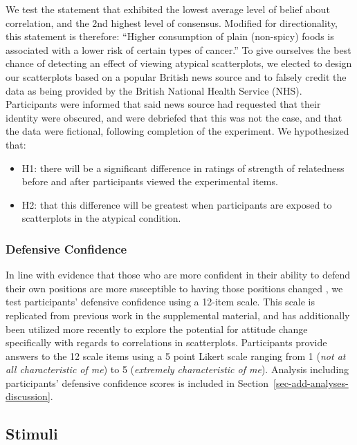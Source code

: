 \documentclass[manuscript,screen,review,anonymous]{acmart}
\providecommand{\tightlist}{%
  \setlength{\itemsep}{0pt}\setlength{\parskip}{0pt}}\usepackage{longtable,booktabs,array}
\begin{document}
We test the statement that exhibited the lowest average level of belief
about correlation, and the 2nd highest level of consensus. Modified for
directionality, this statement is therefore: ``Higher consumption of
plain (non-spicy) foods is associated with a lower risk of certain types
of cancer.'' To give ourselves the best chance of detecting an effect of
viewing atypical scatterplots, we elected to design our scatterplots
based on a popular British news source and to falsely credit the data as
being provided by the British National Health Service (NHS).
Participants were informed that said news source had requested that
their identity were obscured, and were debriefed that this was not the
case, and that the data were fictional, following completion of the
experiment. We hypothesized that:

\begin{itemize}
\tightlist
\item
  H1: there will be a significant difference in ratings of strength of
  relatedness before and after participants viewed the experimental
  items.
\item
  H2: that this difference will be greatest when participants are
  exposed to scatterplots in the atypical condition.
\end{itemize}

\subsubsection{Defensive Confidence}\label{sec-def-con}

In line with evidence that those who are more confident in their ability
to defend their own positions are more susceptible to having those
positions changed \citep{albarracin_2004}, we test participants'
defensive confidence using a 12-item scale. This scale is replicated
from previous work in the supplemental material, and has additionally
been utilized more recently \citep{markant_2023} to explore the
potential for attitude change specifically with regards to correlations
in scatterplots. Participants provide answers to the 12 scale items
using a 5 point Likert scale ranging from 1 (\emph{not at all
characteristic of me}) to 5 (\emph{extremely characteristic of me}).
Analysis including participants' defensive confidence scores is included
in Section~\ref{sec-add-analyses-discussion}.

\subsection{Stimuli}\label{sec-stimuli-main}
\end{document}
